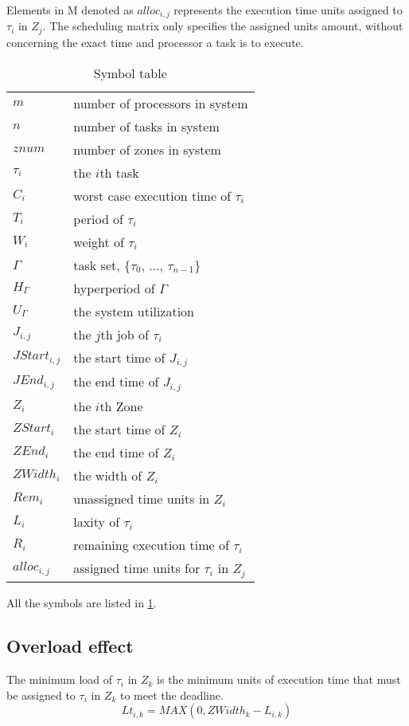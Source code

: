 Elements in M denoted as $alloc_{i,j}$ represents the execution time units assigned to $\tau_i$ in $Z_j$.
The scheduling matrix only specifies the assigned units amount, without concerning the exact time and processor a task is to execute.\\
\begin{table}[H]
\caption{Symbol table}
\centering
\label{tab_sym}
\begin{tabular}{ll}
	\hline
	$m$            & number of processors in system \\
	$n$            & number of tasks in system \\
	$znum$         & number of zones in system \\
	$\tau_i$       & the $i$th task \\
	$C_i$          & worst case execution time of $\tau_i$ \\
	$T_i$          & period of $\tau_i$ \\
	$W_i$          & weight of $\tau_i$ \\
	$\Gamma$       & task set, \{$\tau_0$, ..., $\tau_{n-1}$\} \\
	$H_\Gamma$     & hyperperiod of $\Gamma$ \\
	$U_\Gamma$     & the system utilization \\
	$J_{i,j}$      & the $j$th job of $\tau_i$ \\
	$JStart_{i,j}$ & the start time of $J_{i,j}$ \\
	$JEnd_{i,j}$   & the end time of $J_{i,j}$ \\
	$Z_i$					 & the $i$th Zone\\
	$ZStart_i$     & the start time of $Z_i$ \\
	$ZEnd_i$       & the end time of $Z_i$ \\
	$ZWidth_i$     & the width of $Z_i$ \\
	$Rem_i$        & unassigned time units in $Z_i$ \\
	$L_i$			     & laxity of $\tau_i$ \\
	$R_i$					 & remaining execution time of $\tau_i$ \\
	$alloc_{i,j}$  & assigned time units for $\tau_i$ in $Z_j$ \\
	\hline
\end{tabular}
\end{table}
All the symbols are listed in \ref{tab_sym}.

\subsection{Overload effect}
\begin{defi}
The minimum load of $\tau_i$ in $Z_k$ is the minimum units of execution time that must be assigned to $\tau_i$ in $Z_k$ to meet the deadline.
\[
	Lt_{i,k}=MAX(0,ZWidth_k-L_{i,k})
\]
\end{defi}

